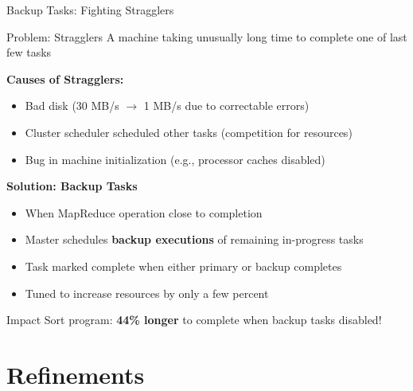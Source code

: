 \documentclass[aspectratio=169]{beamer}
\begin{document}
\begin{frame}{Backup Tasks: Fighting Stragglers}
\begin{block}{Problem: Stragglers}
A machine taking unusually long time to complete one of last few tasks
\end{block}

\vspace{0.3cm}

\textbf{Causes of Stragglers:}
\begin{itemize}
    \item Bad disk (30 MB/s $\rightarrow$ 1 MB/s due to correctable errors)
    \item Cluster scheduler scheduled other tasks (competition for resources)
    \item Bug in machine initialization (e.g., processor caches disabled)
\end{itemize}

\vspace{0.3cm}

\textbf{Solution: Backup Tasks}
\begin{itemize}
    \item When MapReduce operation close to completion
    \item Master schedules \textbf{backup executions} of remaining in-progress tasks
    \item Task marked complete when \alert{either} primary \alert{or} backup completes
    \item Tuned to increase resources by only a few percent
\end{itemize}

\vspace{0.3cm}

\begin{alertblock}{Impact}
Sort program: \textbf{44\% longer} to complete when backup tasks disabled!
\end{alertblock}
\end{frame}

\section{Refinements}
\end{document}
